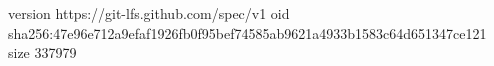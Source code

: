 version https://git-lfs.github.com/spec/v1
oid sha256:47e96e712a9efaf1926fb0f95bef74585ab9621a4933b1583c64d651347ce121
size 337979
